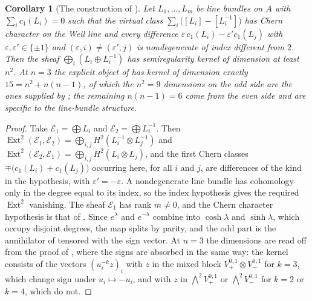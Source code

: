 \documentclass[11pt,reqno]{amsart}
\theoremstyle{plain}
\newtheorem{corollary}[theorem]{Corollary}
\theoremstyle{definition}
\theoremstyle{remark}
\newcommand{\cE}{\mathcal{E}}
\DeclareMathOperator{\Ext}{Ext}
\begin{document}
\begin{corollary}[The construction of ]
\label{cor:pteobstructed}
Let $L_{1},\dots,L_{m}$ be line bundles on $A$ with
$\sum_{i}c_{1}(L_{i})=0$ such that the virtual class
$\sum_{i}\bigl([L_{i}]-[L_{i}^{-1}]\bigr)$ has Chern character on the Weil
line and every difference
$\varepsilon\,c_{1}(L_{i})-\varepsilon'c_{1}(L_{j})$ with
$\varepsilon,\varepsilon'\in\{\pm1\}$ and $(\varepsilon,i)\ne(\varepsilon',j)$
is nondegenerate of index different from $2$. Then the sheaf
$\bigoplus_{i}(L_{i}\oplus L_{i}^{-1})$ has semiregularity kernel of
dimension at least $n^{2}$. At $n=3$ the explicit object of
 has kernel of dimension exactly
$15=n^{2}+n(n-1)$, of which the $n^{2}=9$ dimensions on the odd side are
the ones supplied by ; the remaining $n(n-1)=6$ come from
the even side and are specific to the line-bundle structure.
\end{corollary}

\begin{proof}
Take $\cE_{1}=\bigoplus L_{i}$ and $\cE_{2}=\bigoplus L_{i}^{-1}$. Then
$\Ext^{2}(\cE_{1},\cE_{2})=\bigoplus_{i,j}H^{2}(L_{i}^{-1}\otimes L_{j}^{-1})$
and $\Ext^{2}(\cE_{2},\cE_{1})=\bigoplus_{i,j}H^{2}(L_{i}\otimes L_{j})$, and
the first Chern classes $\mp\bigl(c_{1}(L_{i})+c_{1}(L_{j})\bigr)$ occurring
here, for all $i$ and $j$, are differences of the kind in the hypothesis,
with $\varepsilon'=-\varepsilon$. A nondegenerate line bundle has cohomology only in
the degree equal to its index, so the index hypothesis gives the required
$\Ext^{2}$ vanishing. The sheaf $\cE_{1}$ has rank $m\ne0$, and the Chern
character hypothesis is that of .
Since $e^{\lambda}$ and $e^{-\lambda}$ combine into $\cosh\lambda$ and
$\sinh\lambda$, which occupy disjoint degrees, the map splits by parity, and
the odd part is the annihilator of  tensored with the
sign vector. At $n=3$ the dimensions are read off from the proof of
\cite[Proposition~4.14]{paperII}, where the signs are absorbed in the same way:
the kernel consists of the vectors $(u_{i}^{-k}z)_{i}$ with $z$ in the mixed
block $V_{+}^{0,1}\otimes V_{-}^{0,1}$ for $k=3$, which change sign under
$u_{i}\mapsto-u_{i}$, and with $z$ in $\bigwedge^{2}V_{+}^{0,1}$ or
$\bigwedge^{2}V_{-}^{0,1}$ for $k=2$ or $k=4$, which do not.
\end{proof}
\end{document}
